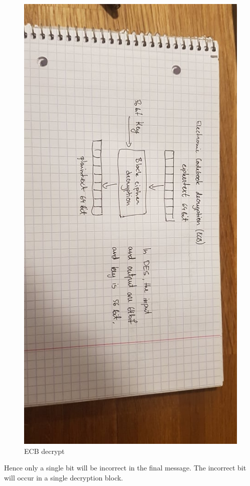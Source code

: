 \documentclass{article}
\begin{document}
\begin{figure}[H]
    \centering
    \label{fig:ecb_decrypt}
    \includegraphics[scale=0.5, angle=90]{ecb_decrypt.jpg}
    \caption{ECB decrypt}
\end{figure}
Hence only a single bit will be incorrect in the final message. The incorrect bit will occur in a single decryption block.
\end{document}
